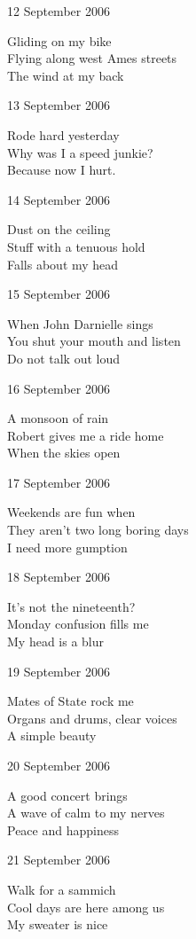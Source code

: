 \documentclass[12pt]{article}
\begin{document}
12 September 2006
      
Gliding on my bike \\
Flying along west Ames streets \\
The wind at my back


\newpage

13 September 2006

Rode hard yesterday \\
Why was I a speed junkie? \\
Because now I hurt.

14 September 2006
      
Dust on the ceiling \\
Stuff with a tenuous hold \\
Falls about my head
      
15 September 2006
      
When John Darnielle sings \\
You shut your mouth and listen \\
Do not talk out loud
      
16 September 2006
      
A monsoon of rain \\
Robert gives me a ride home \\
When the skies open
      
17 September 2006
      
Weekends are fun when \\
They aren't two long boring days \\
I need more gumption
      
18 September 2006
      
It's not the nineteenth? \\
Monday confusion fills me \\
My head is a blur


\newpage

19 September 2006

Mates of State rock me \\
Organs and drums, clear voices \\
A simple beauty

20 September 2006
      
A good concert brings \\
A wave of calm to my nerves \\
Peace and happiness
      
21 September 2006
      
Walk for a sammich \\
Cool days are here among us \\
My sweater is nice
      
\end{document}
